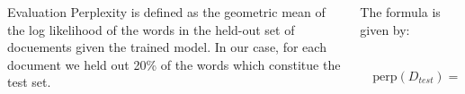 \documentclass[final]{beamer}
\newlength{\onecolwid}
\newlength{\twocolwid}
\begin{document}
\begin{frame}[t]
\begin{columns}[t]
\begin{column}{\twocolwid}
\begin{column}{\twocolwid}
\end{column}

\begin{columns}[t,totalwidth=\twocolwid]\hspace{-0.6in} %

\begin{column}{\onecolwid} %


\begin{block}{Evaluation}
\small
Perplexity is defined as the geometric mean of the log likelihood of the words in the held-out set of docuements given the trained model. In our case, for each document we held out 20\% of the words which constitue the test set.
\end{block}


\end{column} %

\begin{column}{\onecolwid}\hspace{-0.6in} %

\small
\vfill{The formula is given by:}
\begin{center}
$$
	\boxed{\quad\text{perp}(D_{test}) = \frac{\sum_{d \in D_{test}} \sum_{w \in d} \log \left( \sum_{t \in topics} p(w|t) p(t|d) \right)}{\sum_{d \in D_{test}|d|}}\quad}
$$

\end{center}

\end{column} %

\end{columns} %




\end{column}
\end{columns}
\end{frame}
\end{document}
